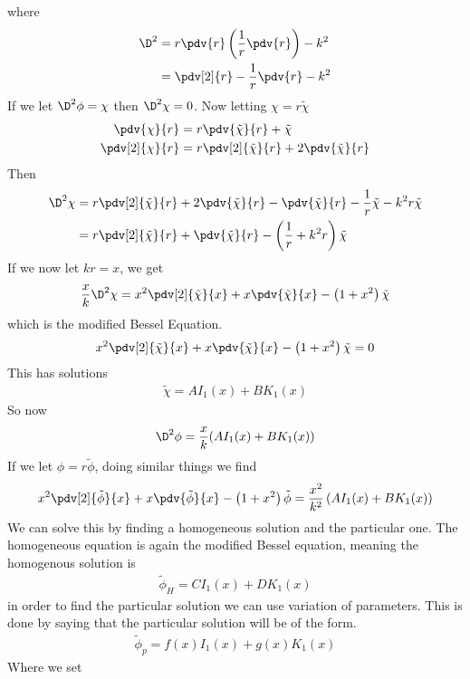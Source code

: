 \documentclass[12pt]{article}
\begin{document}
where \begin{align}\D^2&=r\pdv{r}\left(\frac{1}{r}\pdv{r}\right)-k^2\\&=\pdv[2]{r}-\frac{1}{r}\pdv{r}-k^2\end{align}
If we let $\D^2\phi=\chi$ then $\D^2\chi=0$. Now letting $\chi=r\tilde\chi$
\begin{align}
\pdv{\chi}{r}&=r\pdv{\tilde\chi}{r}+\tilde\chi\\
\pdv[2]{\chi}{r}&=r\pdv[2]{\tilde\chi}{r}+2\pdv{\tilde\chi}{r}
\end{align}
Then
\begin{align}
\D^2\chi&=r\pdv[2]{\tilde\chi}{r}+2\pdv{\tilde\chi}{r}-\pdv{\tilde\chi}{r}-\frac{1}{r}\tilde\chi-k^2r\tilde\chi\\
&=r\pdv[2]{\tilde\chi}{r}+\pdv{\tilde\chi}{r}-\left(\frac{1}{r}+k^2r\right)\tilde\chi\
\end{align}
If we now let $kr=x$, we get
\begin{align}
\frac{x}{k}\D^2\chi=x^2\pdv[2]{\tilde\chi}{x}+x\pdv{\tilde\chi}{x}-\left(1+x^2\right)\tilde\chi
\end{align}
which is the modified Bessel Equation.
\begin{align}
x^2\pdv[2]{\tilde\chi}{x}+x\pdv{\tilde\chi}{x}-\left(1+x^2\right)\tilde\chi=0
\end{align}
This has solutions 
\begin{align}
\tilde\chi=AI_1(x)+BK_1(x)
\end{align}
So now
\begin{align}
\D^2\phi=\frac{x}{k}(AI_1(x)+BK_1(x))
\end{align} If we let $\phi=r\tilde\phi$, doing similar things we find
\begin{align}
x^2\pdv[2]{\tilde\phi}{x}+x\pdv{\tilde\phi}{x}-\left(1+x^2\right)\tilde\phi=\frac{x^2}{k^2}\left(AI_1(x)+BK_1(x)\right)\label{phibessel}
\end{align}
We can solve this by finding a homogeneous solution and the particular one. The homogeneous equation is again the modified Bessel equation, meaning the homogenous solution is
\begin{align}
\tilde\phi_{H}=CI_1(x)+DK_1(x)
\end{align}
in order to find the particular solution we can use variation of parameters. This is done by saying that the particular solution will be of the form.
\begin{align}
\tilde\phi_p=f(x)I_1(x)+g(x)K_1(x)
\end{align}
Where we set 
\end{document}
